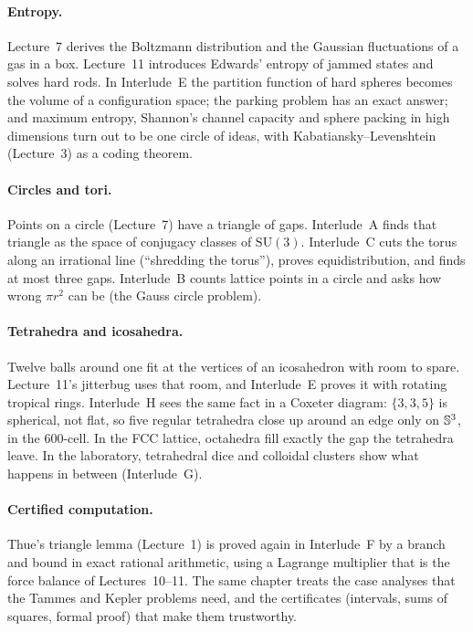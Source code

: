 \paragraph{Entropy.} Lecture~7 derives the Boltzmann distribution and the Gaussian fluctuations of a
gas in a box. Lecture~11 introduces Edwards' entropy of jammed states and solves hard rods. In
Interlude~E the partition function of hard spheres becomes the volume of a configuration space; the
parking problem has an exact answer; and maximum entropy, Shannon's channel capacity and sphere
packing in high dimensions turn out to be one circle of ideas, with Kabatiansky--Levenshtein
(Lecture~3) as a coding theorem.

\paragraph{Circles and tori.} Points on a circle (Lecture~7) have a triangle of gaps. Interlude~A finds
that triangle as the space of conjugacy classes of $\mathrm{SU}(3)$. Interlude~C cuts the torus along an
irrational line (``shredding the torus''), proves equidistribution, and finds at most three gaps.
Interlude~B counts lattice points in a circle and asks how wrong $\pi r^2$ can be (the Gauss circle
problem).

\paragraph{Tetrahedra and icosahedra.} Twelve balls around one fit at the vertices of an icosahedron
with room to spare. Lecture~11's jitterbug uses that room, and Interlude~E proves it with rotating
tropical rings. Interlude~H sees the same fact in a Coxeter diagram: $\{3,3,5\}$ is spherical, not flat,
so five regular tetrahedra close up around an edge only on $\mathbb{S}^3$, in the $600$-cell. In the FCC
lattice, octahedra fill exactly the gap the tetrahedra leave. In the laboratory, tetrahedral dice and
colloidal clusters show what happens in between (Interlude~G).

\paragraph{Certified computation.} Thue's triangle lemma (Lecture~1) is proved again in Interlude~F by
a branch and bound in exact rational arithmetic, using a Lagrange multiplier that is the force balance of
Lectures~10--11. The same chapter treats the case analyses that the Tammes and Kepler problems
need, and the certificates (intervals, sums of squares, formal proof)
that make them trustworthy.
